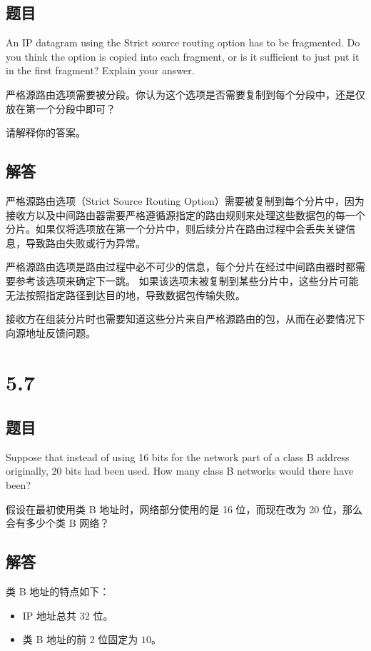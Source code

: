 \subsection*{题目}
An IP datagram using the Strict source routing option has to be fragmented. Do you think the option is copied into each fragment, or is it sufficient to just put it in the first fragment? Explain your answer.

严格源路由选项需要被分段。你认为这个选项是否需要复制到每个分段中，还是仅放在第一个分段中即可？

请解释你的答案。

\subsection*{解答}

严格源路由选项（Strict Source Routing Option）需要被复制到每个分片中，因为接收方以及中间路由器需要严格遵循源指定的路由规则来处理这些数据包的每一个分片。如果仅将选项放在第一个分片中，则后续分片在路由过程中会丢失关键信息，导致路由失败或行为异常。

严格源路由选项是路由过程中必不可少的信息，每个分片在经过中间路由器时都需要参考该选项来确定下一跳。
如果该选项未被复制到某些分片中，这些分片可能无法按照指定路径到达目的地，导致数据包传输失败。

接收方在组装分片时也需要知道这些分片来自严格源路由的包，从而在必要情况下向源地址反馈问题。

\section{5.7}

\subsection*{题目}
Suppose that instead of using 16 bits for the network part of a class B address originally, 20 bits had been used. How many class B networks would there have been?

假设在最初使用类 B 地址时，网络部分使用的是 16 位，而现在改为 20 位，那么会有多少个类 B 网络？

\subsection*{解答}

类 B 地址的特点如下：
\begin{itemize}
    \item IP 地址总共 \( 32 \) 位。
    \item 类 B 地址的前 \( 2 \) 位固定为 \( 10 \)。
\end{itemize}

